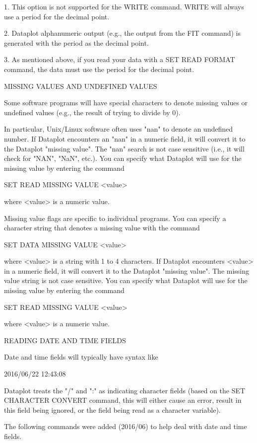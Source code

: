    1. This option is not supported for the WRITE command.  WRITE
      will always use a period for the decimal point.

   2. Dataplot alphanumeric output (e.g., the output from the FIT
      command) is generated with the period as the decimal point.

   3. As mentioned above, if you read your data with a 
      SET READ FORMAT command, the data must use the period
      for the decimal point.


MISSING VALUES AND UNDEFINED VALUES

Some software programs will have special characters to denote
missing values or undefined values (e.g., the result of trying
to divide by 0).

In particular, Unix/Linux software often uses "nan" to denote an
undefined number.  If Dataplot encounters an "nan" in a numeric
field, it will convert it to the Dataplot "missing value".  The "nan"
search is not case sensitive (i.e., it will check for "NAN", "NaN",
etc.).  You can specify what Dataplot will use for the missing value
by entering the command

    SET READ MISSING VALUE  <value>

where <value> is a numeric value.

Missing value flags are specific to individual programs.  You can
specify a character string that denotes a missing value with the
command

    SET DATA MISSING VALUE <value>

where <value> is a string with 1 to 4 characters.  If Dataplot
encounters <value> in a numeric field, it will convert it to the
Dataplot "missing value".  The missing value string is not case
sensitive.  You can specify what Dataplot will use for the missing
value by entering the command

    SET READ MISSING VALUE  <value>

where <value> is a numeric value.

READING DATE AND TIME FIELDS

Date and time fields will typically have syntax like

   2016/06/22
   12:43:08

Dataplot treats the "/" and ":" as indicating character fields
(based on the SET CHARACTER CONVERT command, this will either cause
an error, result in this field being ignored, or the field being
read as a character variable).

The following commands were added (2016/06) to help deal with date and
time fields.

